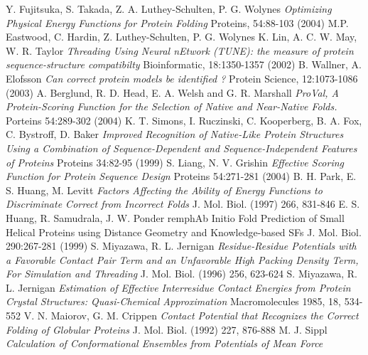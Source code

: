 \documentclass[a4paper,20pt,notitlepage,openbib]{article}
\begin{document}
\begin{thebibliography}{99}
Y. Fujitsuka, S. Takada, Z. A. Luthey-Schulten, P. G. Wolynes
\emph{Optimizing Physical Energy Functions for Protein Folding}
Proteins, 54:88-103 (2004)
M.P. Eastwood, C. Hardin, Z. Luthey-Schulten, P. G. Wolynes
K. Lin, A. C. W. May, W. R. Taylor
\emph{Threading Using Neural nEtwork (TUNE): the measure of protein sequence-structure compatibilty}
Bioinformatic, 18:1350-1357 (2002)
B. Wallner, A. Elofsson
\emph{Can correct protein models be identified ?}
Protein Science, 12:1073-1086 (2003)
A. Berglund, R. D. Head, E. A. Welsh and G. R. Marshall
\emph{ProVal, A Protein-Scoring Function for the Selection of Native and Near-Native Folds.}
Porteins 54:289-302 (2004)
K. T. Simons, I. Ruczinski, C. Kooperberg, B. A. Fox, C. Bystroff, D. Baker
\emph{Improved Recognition of Native-Like Protein Structures Using a Combination of Sequence-Dependent and Sequence-Independent Features of Proteins}
Proteins 34:82-95 (1999)
S. Liang, N. V. Grishin
\emph{Effective Scoring Function for Protein Sequence Design}
Proteins 54:271-281 (2004)
B. H. Park, E. S. Huang, M. Levitt
\emph{Factors Affecting the Ability of Energy Functions to Discriminate Correct from Incorrect Folds}
J. Mol. Biol. (1997) 266, 831-846
E. S. Huang, R. Samudrala, J. W. Ponder
remph{Ab Initio Fold Prediction of Small Helical Proteins using Distance Geometry and Knowledge-based SFs}
J. Mol. Biol. 290:267-281 (1999)
S. Miyazawa, R. L. Jernigan
\emph{Residue-Residue Potentials with a Favorable Contact Pair Term and an Unfavorable High Packing Density Term, For Simulation and Threading}
J. Mol. Biol. (1996) 256, 623-624
S. Miyazawa, R. L. Jernigan
\emph{Estimation of Effective Interresidue Contact Energies from Protein Crystal Structures: Quasi-Chemical Approximation}
Macromolecules 1985, 18, 534-552
V. N. Maiorov, G. M. Crippen
\emph{Contact Potential that Recognizes the Correct Folding of Globular Proteins}
J. Mol. Biol. (1992) 227, 876-888
M. J. Sippl
\emph{Calculation of Conformational Ensembles from Potentials of Mean Force}

\end{thebibliography}
\end{document}
